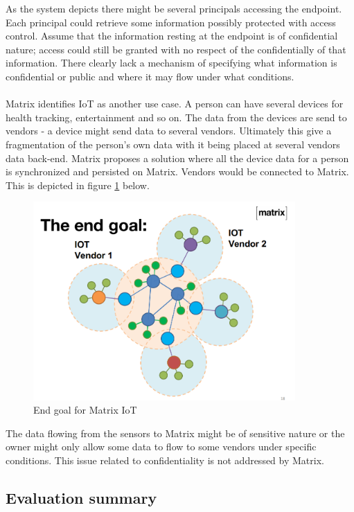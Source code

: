 As the system depicts there might be several principals accessing the endpoint. Each principal could retrieve some information possibly protected with access control. Assume that the information resting at the endpoint is of confidential nature; access could still be granted with no respect of the confidentially of that information. There clearly lack a mechanism of specifying what information is confidential or public and where it may flow under what conditions.  
\\
\\
Matrix identifies IoT as another use case. A person can have several devices for health tracking, entertainment and so on. The data from the devices are send to vendors - a device might send data to several vendors. Ultimately this give a fragmentation of the person's own data with it being placed at several vendors data back-end. Matrix proposes a solution where all the device data for a person is synchronized and persisted on Matrix. Vendors would be connected to Matrix. This is depicted in figure \ref{fig:matrix_iot} below. 

\begin{figure}[H]
	\centering
	\includegraphics[width=10cm]{figures/matrix_iot.png}
	\caption{End goal for Matrix IoT}
	\label{fig:matrix_iot}
\end{figure}

The data flowing from the sensors to Matrix might be of sensitive nature or the owner might only allow some data to flow to some vendors under specific conditions. This issue related to confidentiality is not addressed by Matrix. 

\subsection{Evaluation summary}

